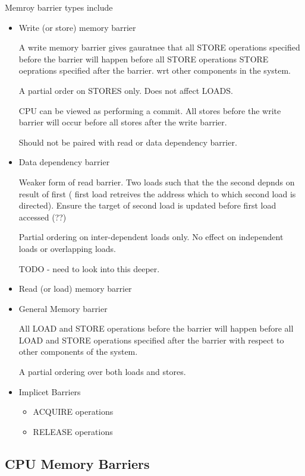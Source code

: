 \documentclass{article}
\begin{document}
Memroy barrier types include
\begin{itemize}
\item Write (or store) memory barrier

  A write memory barrier gives gauratnee that all STORE operations
  specified before the barrier will happen before all STORE operations
  STORE oeprations specified after the barrier. wrt other components
  in the system.

  A partial order on STORES only. Does not affect LOADS.

  CPU can be viewed as performing a commit. All stores before the
  write barrier will occur before all stores after the write barrier.

  Should not be paired with read or data dependency barrier.
  
\item Data dependency barrier

  Weaker form of read barrier. Two loads such that the the second
  depnds on result of first ( first load retreives the address which
  to which second load is directed). Ensure the target of second load
  is updated before first load accessed (??)

  Partial ordering on inter-dependent loads only. No effect on
  independent loads or overlapping loads.


  TODO - need to look into this deeper.


\item Read (or load) memory barrier  

  
  
\item General Memory barrier

  All LOAD and STORE operations before the barrier will happen before
  all LOAD and STORE operations specified after the barrier with
  respect to other components of the system.

  A partial ordering over both loads and stores.  

\item Implicet Barriers
  \begin{itemize}
  \item ACQUIRE operations
  \item RELEASE operations
  \end{itemize}
\end{itemize}



\subsection{CPU Memory Barriers}
\end{document}
